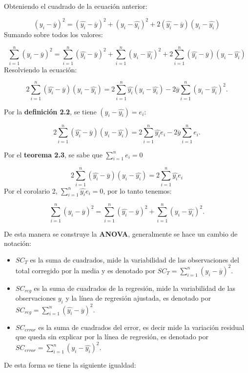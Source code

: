 \documentclass[a4paper,oneside,openany]{book}
\begin{document}
Obteniendo el cuadrado de la ecuación anterior:

\[(y_{i}-\overline{y})^2=(\hat{y_{i}}-\overline{y})^2+(y_{i}-\hat{y_{i}})^2+2(\hat{y_{i}}-\overline{y})(y_{i}-\hat{y_{i}})\]
Sumando sobre todos los valores:

\[\sum_{i=1}^{n}(y_{i}-\overline{y})^2=\sum_{i=1}^{n}(\hat{y_{i}}-\overline{y})^2+\sum_{i=1}^{n}(y_{i}-\hat{y_{i}})^2+2\sum_{i=1}^{n}(\hat{y_{i}}-\overline{y})(y_{i}-\hat{y_{i}})\]
Resolviendo la ecuación:

\[2\sum_{i=1}^{n}(\hat{y_{i}}-\overline{y})(y_{i}-\hat{y_{i}})=2\sum_{i=1}^{n}\hat{y_{i}}(y_{i}-\hat{y_{i}})-2\overline{y}\sum_{i=1}^{n}(y_{i}-\hat{y_{i}})^2.\]

Por la \textbf{definición 2.2}, se tiene \((y_{i}-\hat{y_{i}})=e_{i}\):

\[2\sum_{i=1}^{n}(\hat{y_{i}}-\overline{y})(y_{i}-\hat{y_{i}})=2\sum_{i=1}^{n}\hat{y_{i}}e_{i}-2\overline{y}\sum_{i=1}^{n}e_{i}.\]

Por el \textbf{teorema 2.3}, se sabe que \(\sum_{i=1}^{n}e_{i}=0\)

\[2\sum_{i=1}^{n}(\hat{y_{i}}-\overline{y})(y_{i}-\hat{y_{i}})=2\sum_{i=1}^{n}\hat{y_{i}}e_{i}\]
Por el corolario 2, \(\sum_{i=1}^{n}\hat{y_{i}}e_{i}=0\), por lo tanto
tenemos:

\[\sum_{i=1}^{n}(y_{i}-\overline{y})^2=\sum_{i=1}^{n}(\hat{y_{i}}-\overline{y})^2+\sum_{i=1}^{n}(y_{i}-\hat{y_{i}})^2.\]

De esta manera se construye la \textbf{ANOVA}, generalmente se hace un
cambio de notación:

\begin{itemize}
\item
  \(SC_{T}\) es la suma de cuadrados, mide la variabilidad de las
  observaciones del total corregido por la media y es denotado por
  \(SC_{T}=\sum_{i=1}^{n}(y_{i}-\overline{y})^2.\)
\item
  \(SC_{reg}\) es la suma de cuadrados de la regresión, mide la
  variabilidad de las observaciones \(y_{i}\) y la línea de regresión
  ajustada, es denotado por
  \(SC_{reg}=\sum_{i=1}^{n}(\hat{y_{i}}-\overline{y})^2.\)
\item
  \(SC_{error}\) es la suma de cuadrados del error, es decir mide la
  variación residual que queda sin explicar por la línea de regresión,
  es denotado por \(SC_{error}=\sum_{i=1}^{n}(y_{i}-\hat{y_{i}})^2.\)
\end{itemize}

De esta forma se tiene la siguiente igualdad:
\end{document}
